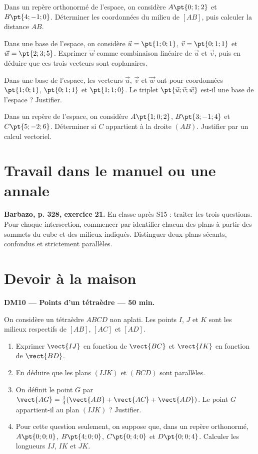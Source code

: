 Dans un repère orthonormé de l'espace, on considère $A\pt{0;1;2}$ et $B\pt{4;-1;0}$. Déterminer les coordonnées du milieu de $[AB]$, puis calculer la distance $AB$.

Dans une base de l'espace, on considère $\vec u=\pt{1;0;1}$, $\vec v=\pt{0;1;1}$ et $\vec w=\pt{2;3;5}$. Exprimer $\vec w$ comme combinaison linéaire de $\vec u$ et $\vec v$, puis en déduire que ces trois vecteurs sont coplanaires.

Dans une base de l'espace, les vecteurs $\vec u$, $\vec v$ et $\vec w$ ont pour coordonnées $\pt{1;0;1}$, $\pt{0;1;1}$ et $\pt{1;1;0}$. Le triplet $\pt{\vec u;\vec v;\vec w}$ est-il une base de l'espace ? Justifier.

Dans un repère de l'espace, on considère $A\pt{1;0;2}$, $B\pt{3;-1;4}$ et $C\pt{5;-2;6}$. Déterminer si $C$ appartient à la droite $(AB)$. Justifier par un calcul vectoriel.


\section{Travail dans le manuel ou une annale}\textbf{Barbazo, p. 328, exercice 21.} En classe après S15 : traiter les trois questions. Pour chaque intersection, commencer par identifier chacun des plans à partir des sommets du cube et des milieux indiqués. Distinguer deux plans sécants, confondus et strictement parallèles.

\mxnewpage
\section{Devoir à la maison}\textbf{DM10 --- Points d'un tétraèdre --- 50 min.}\par On considère un tétraèdre $ABCD$ non aplati. Les points $I$, $J$ et $K$ sont les milieux respectifs de $[AB]$, $[AC]$ et $[AD]$.
\begin{enumerate}\item Exprimer $\vect{IJ}$ en fonction de $\vect{BC}$ et $\vect{IK}$ en fonction de $\vect{BD}$.
\item En déduire que les plans $(IJK)$ et $(BCD)$ sont parallèles.
\item On définit le point $G$ par $\vect{AG}=\frac14(\vect{AB}+\vect{AC}+\vect{AD})$. Le point $G$ appartient-il au plan $(IJK)$ ? Justifier.
\item Pour cette question seulement, on suppose que, dans un repère orthonormé, $A\pt{0;0;0}$, $B\pt{4;0;0}$, $C\pt{0;4;0}$ et $D\pt{0;0;4}$. Calculer les longueurs $IJ$, $IK$ et $JK$.\end{enumerate}

